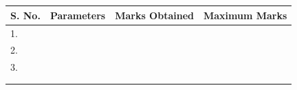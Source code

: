 \documentclass[14pt]{extarticle}
\begin{document}
\section*{}

\begin{center}

\begin{tabular}{ |p{2.5cm}|p{4cm}|p{5cm}|p{5cm}|} 
 \hline
 S. No. & Parameters & Marks Obtained & Maximum Marks \\
 \hline
 1.&&&\\
 \hline
 2.&&&\\
 \hline
 3.&&&\\
 \hline
 &&&\\
 &&&\\
 \hline
\end{tabular}
\end{center}
\end{document}

